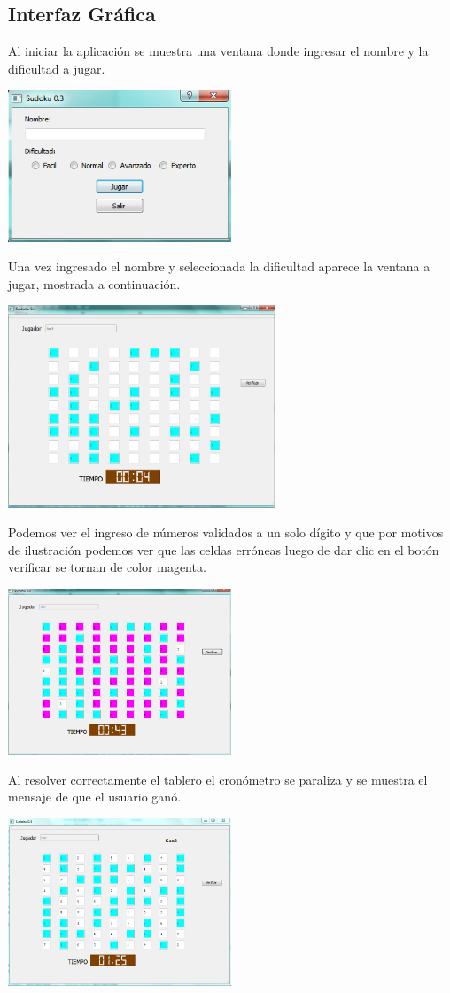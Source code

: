\documentclass[a4paper,11pt]{article}
\begin{document}
	\subsection{Interfaz Gráfica}
		Al iniciar la aplicación se muestra una ventana donde ingresar el nombre y la dificultad a jugar.
		\begin{center}
		\includegraphics[width=0.5\textwidth]{inicio.png}
		\end{center}
		
		Una vez ingresado el nombre y seleccionada la dificultad aparece la ventana a jugar, mostrada a continuación.
		\begin{center}
			\includegraphics[width = 0.6\textwidth]{juego1.png}
		\end{center}
	 
	 Podemos ver el ingreso de números validados a un solo dígito y que por motivos de ilustración podemos ver que las celdas erróneas luego de dar clic en el botón verificar se tornan de color magenta.
	 
	 \begin{center}
	 	\includegraphics[width = 0.5\textwidth]{juego2.png}
	 \end{center}
	 
	 Al resolver correctamente el tablero el cronómetro se paraliza y se muestra el mensaje de que el usuario ganó.
	 \begin{center}
	 	\includegraphics[width = 0.5\textwidth]{juego3.png}
	 \end{center}
	 
	 
\end{document}
